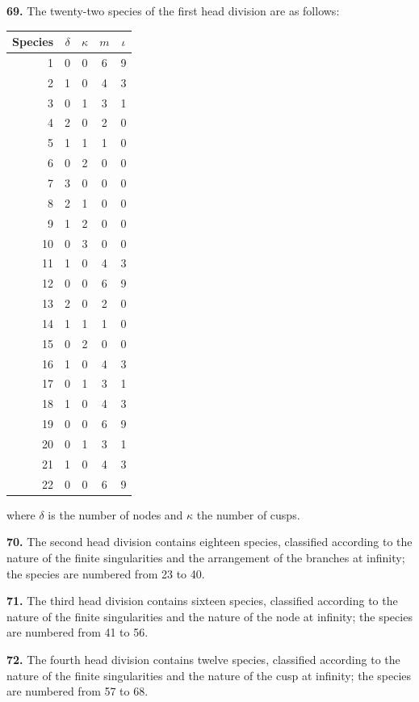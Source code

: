 \documentclass[11pt,a4paper]{article}
\theoremstyle{plain}
\theoremstyle{definition}
\begin{document}
\textbf{69.} The twenty-two species of the first head division are as follows:
\begin{center}
\small
\begin{tabular}{@{}rcccc@{}}
\toprule
\textbf{Species} & $\delta$ & $\kappa$ & $m$ & $\iota$ \\
\midrule
1 & 0 & 0 & 6 & 9 \\
2 & 1 & 0 & 4 & 3 \\
3 & 0 & 1 & 3 & 1 \\
4 & 2 & 0 & 2 & 0 \\
5 & 1 & 1 & 1 & 0 \\
6 & 0 & 2 & 0 & 0 \\
7 & 3 & 0 & 0 & 0 \\
8 & 2 & 1 & 0 & 0 \\
9 & 1 & 2 & 0 & 0 \\
10 & 0 & 3 & 0 & 0 \\
11 & 1 & 0 & 4 & 3 \\
12 & 0 & 0 & 6 & 9 \\
13 & 2 & 0 & 2 & 0 \\
14 & 1 & 1 & 1 & 0 \\
15 & 0 & 2 & 0 & 0 \\
16 & 1 & 0 & 4 & 3 \\
17 & 0 & 1 & 3 & 1 \\
18 & 1 & 0 & 4 & 3 \\
19 & 0 & 0 & 6 & 9 \\
20 & 0 & 1 & 3 & 1 \\
21 & 1 & 0 & 4 & 3 \\
22 & 0 & 0 & 6 & 9 \\
\bottomrule
\end{tabular}
\end{center}
where $\delta$ is the number of nodes and $\kappa$ the number of cusps.

\textbf{70.} The second head division contains eighteen species, classified according to the nature of the finite singularities and the arrangement of the branches at infinity; the species are numbered from 23 to 40.

\textbf{71.} The third head division contains sixteen species, classified according to the nature of the finite singularities and the nature of the node at infinity; the species are numbered from 41 to 56.

\textbf{72.} The fourth head division contains twelve species, classified according to the nature of the finite singularities and the nature of the cusp at infinity; the species are numbered from 57 to 68.
\end{document}
